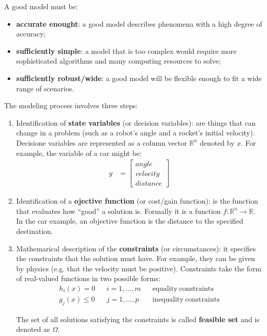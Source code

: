 A good model must be:
\begin{itemize}
    \item \textbf{accurate enought}: a good model describes phenomena with a high degree of accuracy;
    \item \textbf{sufficiently simple}: a model that is too complex would require more sophisticated algorithms and many computing resources to solve;
    \item \textbf{sufficiently robust/wide}: a good model will be flexible enough to fit a wide range of scenarios.
\end{itemize}

The modeling process involves three steps:
\begin{enumerate}
    \item Identification of \textbf{state variables} (or decision variables): are things that can change in a problem (such as a robot's angle and a rocket's initial velocity). Decisione variables are represented as a column vector \( \mathbb{R}^n \) denoted by \( x \). For example, the variable of a car might be:
    \begin{align*}
        y &= \begin{bmatrix}
                \mathit{angle} \\
                \mathit{velocity} \\
                \mathit{distance} 
             \end{bmatrix}
    \end{align*} 

    \item Identification of a \textbf{ojective function} (or cost/gain function): is the function that evaluates how ``good'' a solution is. Formally it is a function \( f : \mathbb{R}^n \rightarrow \mathbb{R} \). In the car example, an objective function is the distance to the specified destination.
    
    \item Mathemarical description of the \textbf{constraints} (or circumstances): it specifies the constraints that the solution must have. For example, they can be given by physics (e.g. that the velocity must be positive). 
    Constraints take the form of real-valued functions in two possible forms:
    \begin{align*}
        h_i(x) = 0 && i = 1, ..., m && \mathrm{equality~constraints} \\
        g_j(x) \leq 0 && j = 1, ..., p && \mathrm{inequality~constraints}
    \end{align*}

    The set of all solutions satisfying the constraints is called \textbf{feasible set} and is denoted as \( \Omega \).
\end{enumerate}

